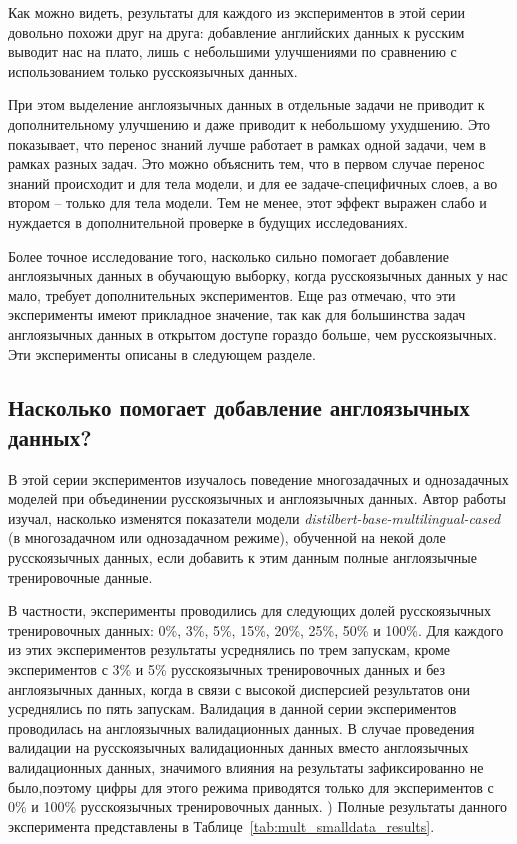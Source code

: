 Как можно видеть, результаты для каждого из экспериментов в этой серии довольно похожи друг на друга: добавление английских данных к русским выводит нас на плато, лишь с небольшими улучшениями по сравнению с использованием только русскоязычных данных.  

При этом выделение англоязычных данных в отдельные задачи не приводит к дополнительному улучшению и даже приводит к небольшому ухудшению. Это показывает, что перенос знаний лучше работает в рамках одной задачи, чем в рамках разных задач. Это можно  объяснить тем, что в первом случае перенос знаний происходит и для тела модели, и для ее задаче-специфичных слоев, а во втором -- только для тела модели. Тем не менее, этот эффект выражен слабо и нуждается в дополнительной проверке в будущих исследованиях.

Более точное исследование того, насколько сильно помогает добавление англоязычных данных в обучающую выборку, когда русскоязычных данных у нас мало, требует дополнительных экспериментов. Еще раз отмечаю, что эти эксперименты имеют прикладное значение, так как для большинства задач англоязычных данных в открытом доступе гораздо больше, чем русскоязычных. Эти эксперименты описаны в следующем разделе.

\subsection{Насколько помогает добавление англоязычных данных? }

В этой серии экспериментов изучалось поведение многозадачных и однозадачных моделей при объединении русскоязычных и англоязычных данных.  Автор работы изучал, насколько изменятся показатели модели \textit{distilbert-base-multilingual-cased} (в многозадачном или однозадачном режиме), обученной на некой доле русскоязычных данных, если добавить к этим данным полные англоязычные тренировочные данные.

В частности, эксперименты проводились для следующих долей русскоязычных тренировочных данных: 0\%, 3\%, 5\%, 15\%, 20\%, 25\%, 50\% и 100\%. Для каждого из этих экспериментов результаты усреднялись по трем запускам, кроме экспериментов с 3\% и 5\% русскоязычных тренировочных данных и без англоязычных данных, когда в связи с высокой дисперсией результатов они усреднялись по пять запускам. 
Валидация в данной серии экспериментов проводилась на англоязычных валидационных данных. В случае проведения валидации на русскоязычных валидационных данных вместо англоязычных валидационных данных, значимого влияния на результаты зафиксированно не было,поэтому цифры для этого режима приводятся только для экспериментов с 0\% и 100\% русскоязычных тренировочных данных. ) 
 Полные результаты данного эксперимента представлены в Таблице~\ref{tab:mult_smalldata_results}. 

